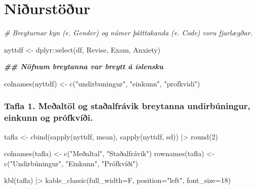 \documentclass[
]{article}
\newenvironment{Shaded}{\begin{snugshade}}{\end{snugshade}}
\newcommand{\AttributeTok}[1]{\textcolor[rgb]{0.77,0.63,0.00}{#1}}
\newcommand{\CommentTok}[1]{\textcolor[rgb]{0.56,0.35,0.01}{\textit{#1}}}
\newcommand{\DecValTok}[1]{\textcolor[rgb]{0.00,0.00,0.81}{#1}}
\newcommand{\DocumentationTok}[1]{\textcolor[rgb]{0.56,0.35,0.01}{\textbf{\textit{#1}}}}
\newcommand{\FunctionTok}[1]{\textcolor[rgb]{0.00,0.00,0.00}{#1}}
\newcommand{\NormalTok}[1]{#1}
\newcommand{\OtherTok}[1]{\textcolor[rgb]{0.56,0.35,0.01}{#1}}
\newcommand{\SpecialCharTok}[1]{\textcolor[rgb]{0.00,0.00,0.00}{#1}}
\newcommand{\StringTok}[1]{\textcolor[rgb]{0.31,0.60,0.02}{#1}}
\begin{document}
\hypertarget{niuxf0urstuxf6uxf0ur}{%
\section{Niðurstöður}\label{niuxf0urstuxf6uxf0ur}}

\begin{Shaded}
\begin{Highlighting}[]
\CommentTok{\# Breyturnar kyn (e. Gender) og númer þátttakanda (e. Code) voru fjarlægðar.}

\NormalTok{nyttdf }\OtherTok{\textless{}{-}}\NormalTok{ dplyr}\SpecialCharTok{::}\FunctionTok{select}\NormalTok{(df, Revise, Exam, Anxiety)}
\end{Highlighting}
\end{Shaded}

\begin{Shaded}
\begin{Highlighting}[]
\DocumentationTok{\#\# Nöfnum breytanna var breytt á íslensku}

\FunctionTok{colnames}\NormalTok{(nyttdf) }\OtherTok{\textless{}{-}} \FunctionTok{c}\NormalTok{(}\StringTok{"undirbuningur"}\NormalTok{, }\StringTok{"einkunn"}\NormalTok{, }\StringTok{"profkvidi"}\NormalTok{)}
\end{Highlighting}
\end{Shaded}

\hypertarget{tafla-1.-meuxf0altuxf6l-og-stauxf0alfruxe1vik-breytanna-undirbuxfaningur-einkunn-og-pruxf3fkvuxeduxf0i.}{%
\subsubsection{Tafla 1. Meðaltöl og staðalfrávik breytanna
undirbúningur, einkunn og
prófkvíði.}\label{tafla-1.-meuxf0altuxf6l-og-stauxf0alfruxe1vik-breytanna-undirbuxfaningur-einkunn-og-pruxf3fkvuxeduxf0i.}}

\begin{Shaded}
\begin{Highlighting}[]
\NormalTok{tafla }\OtherTok{\textless{}{-}} \FunctionTok{cbind}\NormalTok{(}\FunctionTok{sapply}\NormalTok{(nyttdf, mean), }\FunctionTok{sapply}\NormalTok{(nyttdf, sd)) }\SpecialCharTok{|\textgreater{}} \FunctionTok{round}\NormalTok{(}\DecValTok{2}\NormalTok{)}

\FunctionTok{colnames}\NormalTok{(tafla) }\OtherTok{\textless{}{-}} \FunctionTok{c}\NormalTok{(}\StringTok{"Meðaltal"}\NormalTok{, }\StringTok{"Staðalfrávik"}\NormalTok{)}
\FunctionTok{rownames}\NormalTok{(tafla) }\OtherTok{\textless{}{-}} \FunctionTok{c}\NormalTok{(}\StringTok{"Undirbúningur"}\NormalTok{, }\StringTok{"Einkunn"}\NormalTok{, }\StringTok{"Prófkvíði"}\NormalTok{)}


\FunctionTok{kbl}\NormalTok{(tafla) }\SpecialCharTok{|\textgreater{}} \FunctionTok{kable\_classic}\NormalTok{(}\AttributeTok{full\_width=}\NormalTok{F, }\AttributeTok{position=}\StringTok{"left"}\NormalTok{, }\AttributeTok{font\_size=}\DecValTok{18}\NormalTok{)}
\end{Highlighting}
\end{Shaded}
\end{document}
